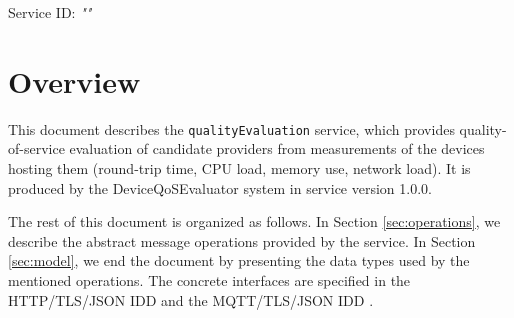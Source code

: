 \documentclass[a4paper]{arrowhead}
\begin{document}
\sloppy

\ArrowheadSetup

\begin{center}
  \vspace*{1cm}
  \huge{\arrowtitle}

  \vspace*{0.2cm}
  \LARGE{\arrowtype}
  \vspace*{1cm}

  \Large{Service ID: \textit{"\arrowid"}}

  \vspace*{\fill}


  \vspace*{1cm}
  \vspace*{\fill}

  \begin{abstract}
    This document describes the \texttt{qualityEvaluation} service, version 1.0.0, produced by the DeviceQoSEvaluator support system of Arrowhead 5.2.2.
  \end{abstract}

  \vspace*{1cm}
\end{center}

\newpage

\tableofcontents
\newpage

\section{Overview}
\label{sec:overview}

This document describes the \texttt{qualityEvaluation} service, which provides quality-of-service evaluation of candidate providers from measurements of the devices hosting them (round-trip time, CPU load, memory use, network load).
It is produced by the DeviceQoSEvaluator system \cite{dqe-sysd} in service version 1.0.0.

The rest of this document is organized as follows.
In Section \ref{sec:operations}, we describe the abstract message operations provided by the service.
In Section \ref{sec:model}, we end the document by presenting the data types used by the mentioned operations.
The concrete interfaces are specified in the HTTP/TLS/JSON IDD \cite{dqe-qualityEvaluation-http-idd} and the MQTT/TLS/JSON IDD \cite{dqe-qualityEvaluation-mqtt-idd}.
\end{document}
